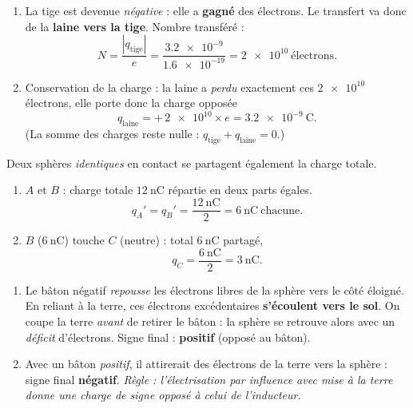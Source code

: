 \documentclass[11pt,a4paper]{article}
\begin{document}

\begin{corrige}
\begin{enumerate}[label=\alph*)]
  \item La tige est devenue \emph{négative} : elle a \textbf{gagné} des électrons. Le transfert va
        donc de la \textbf{laine vers la tige}. Nombre transféré :
        \[ N = \frac{|q_{\text{tige}}|}{e} = \frac{\num{3.2e-9}}{\num{1.6e-19}} = \num{2e10}\ \text{électrons}. \]
  \item Conservation de la charge : la laine a \emph{perdu} exactement ces $\num{2e10}$ électrons,
        elle porte donc la charge opposée
        \[ q_{\text{laine}} = +\,\num{2e10}\times e = \SI{+3.2e-9}{\coulomb}. \]
        (La somme des charges reste nulle : $q_{\text{tige}}+q_{\text{laine}}=0$.)
\end{enumerate}
\end{corrige}

\begin{corrige}
Deux sphères \emph{identiques} en contact se partagent également la charge totale.
\begin{enumerate}[label=\alph*)]
  \item $A$ et $B$ : charge totale $\SI{12}{\nano\coulomb}$ répartie en deux parts égales.
        \[ q_A' = q_B' = \frac{\SI{12}{\nano\coulomb}}{2} = \SI{6}{\nano\coulomb}\ \text{chacune}. \]
  \item $B$ ($\SI{6}{\nano\coulomb}$) touche $C$ (neutre) : total $\SI{6}{\nano\coulomb}$ partagé,
        \[ q_C = \frac{\SI{6}{\nano\coulomb}}{2} = \SI{3}{\nano\coulomb}. \]
\end{enumerate}
\end{corrige}

\begin{corrige}
\begin{enumerate}[label=\alph*)]
  \item Le bâton négatif \emph{repousse} les électrons libres de la sphère vers le côté éloigné.
        En reliant à la terre, ces électrons excédentaires \textbf{s'écoulent vers le sol}. On coupe
        la terre \emph{avant} de retirer le bâton : la sphère se retrouve alors avec un
        \emph{déficit} d'électrons. Signe final : \textbf{positif} (opposé au bâton).
  \item Avec un bâton \emph{positif}, il attirerait des électrons de la terre vers la sphère : signe
        final \textbf{négatif}. \emph{Règle : l'électrisation par influence avec mise à la terre
        donne une charge de signe opposé à celui de l'inducteur.}
\end{enumerate}
\end{corrige}
\end{document}
